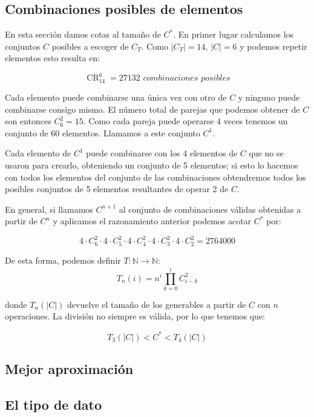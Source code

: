 \subsection{Combinaciones posibles de elementos}

En esta sección damos cotas al tamaño de $C^{\ast}$. En primer lugar calculamos
los conjuntos $C$ posibles a escoger de $C_T$. Como $|C_T| = 14$, $|C| = 6$ y
podemos repetir elementos esto resulta en:

\[\operatorname{CR}_{14}^{6} = 27132 \textit{ combinaciones posibles}\]

Cada elemento puede combinarse una única vez con otro de $C$
y ninguno puede combinarse consigo mismo. El número total de parejas que podemos
obtener de $C$ son entonces $C_{6}^{2}=15$.
Como cada pareja puede operarse 4 veces tenemos un conjunto de 60 elementos.
Llamamos a este conjunto $C^1$.

Cada elemento de $C^1$ puede combinarse con los 4 elementos de $C$ que no se
usaron para crearlo, obteniendo un conjunto de 5 elementos;
si esto lo hacemos con todos los elementos del conjunto de las combinaciones
obtendremos todos los posibles conjuntos de 5 elementos resultantes de operar
2 de $C$.

En general, si llamamos $C^{n+1}$ al conjunto de combinaciones válidas obtenidas
a partir de $C^n$ y aplicamos el razonamiento anterior podemos acotar $C^{\ast}$
por:

\[ 4 \cdot C_6^2 \cdot 4 \cdot C_5^2 \cdot 4 \cdot C_4^2 \cdot 4 \cdot C_3^2 \cdot 4 \cdot C_2^2= 2764000\]

De esta forma, podemos definir $T:\mathbb{N} \to \mathbb{N}$:
\[T_n(i)=n^i\prod_{k=0}^{i}C_{i-k}^{2}\]

donde $T_n(|C|)$ devuelve el tamaño de los generables a partir de $C$ con $n$
operaciones. La división no siempre es válida, por lo que tenemos que:

\[T_3(|C|) < C^{\ast} < T_4(|C|)\]

\subsection{Mejor aproximación}
\subsection{El tipo de dato}
